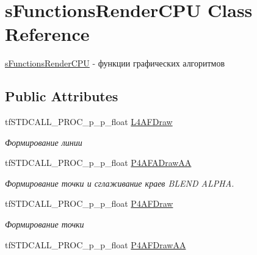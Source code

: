 \hypertarget{structs_functions_render_c_p_u}{\section{s\-Functions\-Render\-C\-P\-U Class Reference}
\label{structs_functions_render_c_p_u}
}


\hyperlink{structs_functions_render_c_p_u}{s\-Functions\-Render\-C\-P\-U} -\/ функции графических алгоритмов  


\subsection*{Public Attributes}
\begin{DoxyCompactItemize}
\item 
\hypertarget{structs_functions_render_c_p_u_a40fe92e2dda1ee70bd6464e61ff986d6}{tf\-S\-T\-D\-C\-A\-L\-L\-\_\-\-P\-R\-O\-C\-\_\-p\-\_\-p\-\_\-float \hyperlink{structs_functions_render_c_p_u_a40fe92e2dda1ee70bd6464e61ff986d6}{L4\-A\-F\-Draw}}\label{structs_functions_render_c_p_u_a40fe92e2dda1ee70bd6464e61ff986d6}

\begin{DoxyCompactList}\small\item\em Формирование линии \end{DoxyCompactList}\item 
\hypertarget{structs_functions_render_c_p_u_a086db95b1d9d7e7e282c49afc4b8c1f9}{tf\-S\-T\-D\-C\-A\-L\-L\-\_\-\-P\-R\-O\-C\-\_\-p\-\_\-p\-\_\-float \hyperlink{structs_functions_render_c_p_u_a086db95b1d9d7e7e282c49afc4b8c1f9}{P4\-A\-F\-A\-Draw\-A\-A}}\label{structs_functions_render_c_p_u_a086db95b1d9d7e7e282c49afc4b8c1f9}

\begin{DoxyCompactList}\small\item\em Формирование точки и сглаживание краев B\-L\-E\-N\-D A\-L\-P\-H\-A. \end{DoxyCompactList}\item 
\hypertarget{structs_functions_render_c_p_u_aa0f145ce23cfc1827719b9635871205c}{tf\-S\-T\-D\-C\-A\-L\-L\-\_\-\-P\-R\-O\-C\-\_\-p\-\_\-p\-\_\-float \hyperlink{structs_functions_render_c_p_u_aa0f145ce23cfc1827719b9635871205c}{P4\-A\-F\-Draw}}\label{structs_functions_render_c_p_u_aa0f145ce23cfc1827719b9635871205c}

\begin{DoxyCompactList}\small\item\em Формирование точки \end{DoxyCompactList}\item 
\hypertarget{structs_functions_render_c_p_u_a830be636891a0f782d87f803e7207ba4}{tf\-S\-T\-D\-C\-A\-L\-L\-\_\-\-P\-R\-O\-C\-\_\-p\-\_\-p\-\_\-float \hyperlink{structs_functions_render_c_p_u_a830be636891a0f782d87f803e7207ba4}{P4\-A\-F\-Draw\-A\-A}}\label{structs_functions_render_c_p_u_a830be636891a0f782d87f803e7207ba4}


\end{DoxyCompactItemize}
